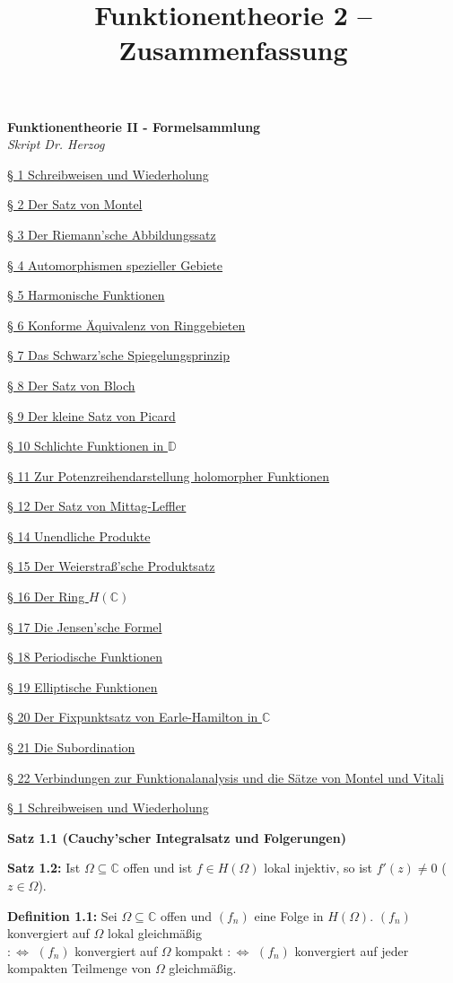 \documentclass[11pt]{article}
\title{Funktionentheorie 2 -- Zusammenfassung}
\newcommand{\C}{\mathbb{C}}
\newcommand{\D}{\mathbb{D}}
\begin{document}
\begin{center}
{\Large \textbf{Funktionentheorie II - Formelsammlung}} \\
\textit{Skript Dr. Herzog}
\end{center}

\underline{§ 1 Schreibweisen und Wiederholung}

\underline{§ 2 Der Satz von Montel}

\underline{§ 3 Der Riemann'sche Abbildungssatz}

\underline{§ 4 Automorphismen spezieller Gebiete} 

\underline{§ 5 Harmonische Funktionen}

\underline{§ 6 Konforme Äquivalenz von Ringgebieten}

\underline{§ 7 Das Schwarz'sche Spiegelungsprinzip}

\underline{§ 8 Der Satz von Bloch}

\underline{§ 9 Der kleine Satz von Picard}

\underline{§ 10 Schlichte Funktionen in $\D$}

\underline{§ 11 Zur Potenzreihendarstellung holomorpher Funktionen}

\underline{§ 12 Der Satz von Mittag-Leffler}

\underline{§ 14 Unendliche Produkte}

\underline{§ 15 Der Weierstraß'sche Produktsatz}

\underline{§ 16 Der Ring $H(\C)$}

\underline{§ 17 Die Jensen'sche Formel}

\underline{§ 18 Periodische Funktionen}

\underline{§ 19 Elliptische Funktionen}

\underline{§ 20 Der Fixpunktsatz von Earle-Hamilton in $\C$}

\underline{§ 21 Die Subordination}

\underline{§ 22 Verbindungen zur Funktionalanalysis und die Sätze von Montel und Vitali}

\newpage

\underline{§ 1 Schreibweisen und Wiederholung}

\textbf{Satz 1.1 (Cauchy'scher Integralsatz und Folgerungen)}

\textbf{Satz 1.2:} Ist $\Omega \subseteq \C$ offen und ist $f \in H(\Omega)$ lokal injektiv, so ist $f'(z) \neq 0$ ($z \in \Omega$).

\textbf{Definition 1.1:} Sei $\Omega \subseteq \C$ offen und $(f_n)$ eine Folge in $H(\Omega)$. $(f_n)$ konvergiert auf $\Omega$ lokal gleichmäßig \\
$:\Leftrightarrow$ $(f_n)$ konvergiert auf $\Omega$ kompakt $:\Leftrightarrow$ $(f_n)$ konvergiert auf jeder kompakten Teilmenge von $\Omega$ gleichmäßig.
\end{document}
